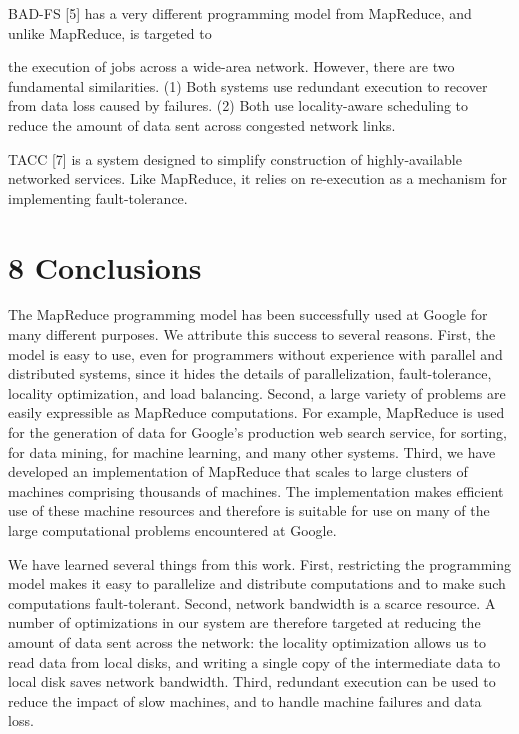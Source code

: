 \documentclass[
]{article}
\begin{document}
BAD-FS {[}5{]} has a very different programming model from MapReduce,
and unlike MapReduce, is targeted to

the execution of jobs across a wide-area network. However, there are two
fundamental similarities. (1) Both systems use redundant execution to
recover from data loss caused by failures. (2) Both use locality-aware
scheduling to reduce the amount of data sent across congested network
links.

TACC {[}7{]} is a system designed to simplify construction of
highly-available networked services. Like MapReduce, it relies on
re-execution as a mechanism for implementing fault-tolerance.

\section{8 Conclusions}\label{conclusions}

The MapReduce programming model has been successfully used at Google for
many different purposes. We attribute this success to several reasons.
First, the model is easy to use, even for programmers without experience
with parallel and distributed systems, since it hides the details of
parallelization, fault-tolerance, locality optimization, and load
balancing. Second, a large variety of problems are easily expressible as
MapReduce computations. For example, MapReduce is used for the
generation of data for Google's production web search service, for
sorting, for data mining, for machine learning, and many other systems.
Third, we have developed an implementation of MapReduce that scales to
large clusters of machines comprising thousands of machines. The
implementation makes efficient use of these machine resources and
therefore is suitable for use on many of the large computational
problems encountered at Google.

We have learned several things from this work. First, restricting the
programming model makes it easy to parallelize and distribute
computations and to make such computations fault-tolerant. Second,
network bandwidth is a scarce resource. A number of optimizations in our
system are therefore targeted at reducing the amount of data sent across
the network: the locality optimization allows us to read data from local
disks, and writing a single copy of the intermediate data to local disk
saves network bandwidth. Third, redundant execution can be used to
reduce the impact of slow machines, and to handle machine failures and
data loss.
\end{document}
